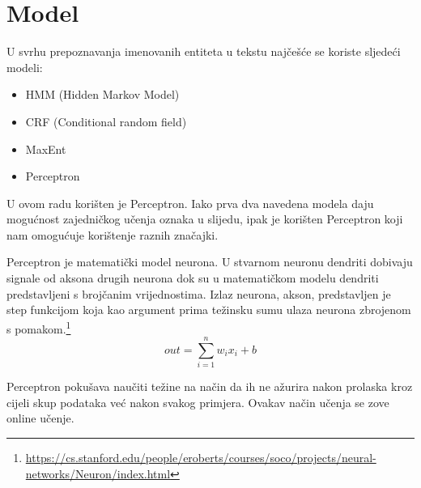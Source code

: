 \documentclass[times, utf8, seminar]{fer}
\begin{document}
\chapter{Model}
U svrhu prepoznavanja imenovanih entiteta u tekstu najčešće se koriste sljedeći modeli: 
\begin{itemize}
\item HMM (Hidden Markov Model)
\item CRF (Conditional random field)
\item MaxEnt
\item Perceptron
\end{itemize}

U ovom radu korišten je Perceptron. Iako prva dva navedena modela daju mogućnost zajedničkog učenja oznaka u slijedu, ipak je korišten Perceptron koji nam omogućuje korištenje raznih značajki.

\indent Perceptron je matematički model neurona. U stvarnom neuronu dendriti dobivaju signale od aksona drugih neurona dok su u matematičkom modelu dendriti predstavljeni s brojčanim vrijednostima. Izlaz neurona, akson, predstavljen je step funkcijom koja kao argument prima težinsku sumu ulaza neurona zbrojenom s pomakom.\footnote{\url{https://cs.stanford.edu/people/eroberts/courses/soco/projects/neural-networks/Neuron/index.html}}
\[ out = \sum_{i=1}^{n} w_ix_i + b\]

Perceptron pokušava naučiti težine na način da ih ne ažurira nakon prolaska kroz cijeli skup podataka već nakon svakog primjera. Ovakav način učenja se zove online učenje.  
\newpage
\begin{center}
\end{center}
\end{document}
